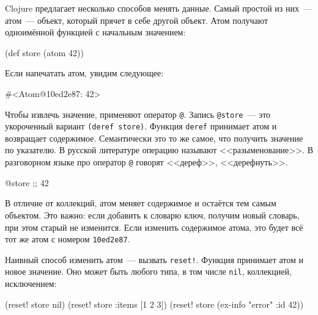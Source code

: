 
Clojure предлагает несколько способов менять данные. Самый простой из них~---
атом~--- объект, который прячет в себе другой объект. Атом получают
одноимённой функцией с начальным значением:

\begin{english}
  \begin{clojure}
(def store (atom 42))
  \end{clojure}
\end{english}

Если напечатать атом, увидим следующее:

\begin{english}
  \begin{clojure}
#<Atom@10ed2e87: 42>
  \end{clojure}
\end{english}

Чтобы извлечь значение, применяют оператор \verb|@|. Запись \verb|@store|~---
это укороченный вариант \verb|(deref store)|. Функция \verb|deref| принимает
атом и возвращает содержимое. Семантически это то же самое, что получить
значение по указателю. В русской литературе операцию называют
<<разыменование>>. В разговорном языке про оператор \verb|@| говорят
<<дереф>>, <<дерефнуть>>.


\begin{english}
  \begin{clojure}
@store ;; 42
  \end{clojure}
\end{english}

В отличие от коллекций, атом меняет содержимое и остаётся тем самым
объектом. Это важно: если добавить к словарю ключ, получим новый словарь, при
этом старый не изменится. Если изменить содержимое атома, это будет всё тот
же атом с номером \verb|10ed2e87|.


Наивный способ изменить атом~--- вызвать \verb|reset!|. Функция принимает атом
и новое значение. Оно может быть любого типа, в том числе \verb|nil|,
коллекцией, исключением:

\ifx\DEVICETYPE\MOBILE

\begin{english}
  \begin{clojure}
(reset! store nil)
(reset! store {:items [1 2 3]})
(reset! store (ex-info "error"
                {:id 42}))
  \end{clojure}
\end{english}

